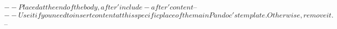 $-- Placed at the end of the body, after 'include-after' content
$-- %
$-- Use it if you need to insert content at this specific place of the main Pandoc's template. Otherwise, remove it.
$-- %

\processdelayedfloats